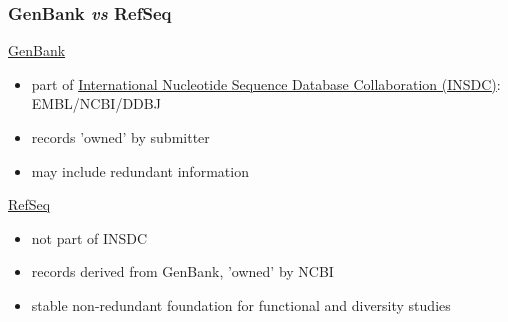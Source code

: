 \begin{frame}
  \frametitle{GenBank \textit{vs} RefSeq}
    \begin{alertblock}{\href{http://www.ncbi.nlm.nih.gov/genbank/}{GenBank}}
      \begin{itemize}
        \item part of \textcolor{hutton_purple}{\href{http://www.insdc.org/}{International Nucleotide Sequence Database Collaboration (INSDC)}}: EMBL/NCBI/DDBJ
        \item records 'owned' by submitter
        \item may include redundant information
      \end{itemize}
    \end{alertblock}
    \begin{block}{\href{http://www.ncbi.nlm.nih.gov/refseq/about}{RefSeq}}
      \begin{itemize}
        \item not part of INSDC
        \item records derived from GenBank, 'owned' by NCBI
        \item stable non-redundant foundation for functional and diversity studies
      \end{itemize}
    \end{block}
\end{frame}

